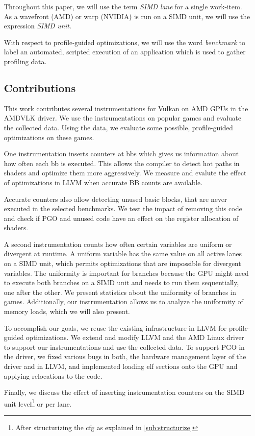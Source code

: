 Throughout this paper, we will use the term \emph{SIMD lane} for a single work-item. As a wavefront (AMD) or warp (NVIDIA) is run on a SIMD unit, we will use the expression \emph{SIMD unit}.

With respect to profile-guided optimizations, we will use the word \emph{benchmark} to label an automated, scripted execution of an application which is used to gather profiling data.


\subsection{Contributions}
\label{sub:contributions}
This work contributes several instrumentations for Vulkan on AMD GPUs in the AMDVLK driver. We use the instrumentations on popular games and evaluate the collected data. Using the data, we evaluate some possible, profile-guided optimizations on these games.

One instrumentation inserts counters at \glspl{bb} which gives us information about how often each \gls{bb} is executed. This allows the compiler to detect hot paths in shaders and optimize them more aggressively. We measure and evalute the effect of optimizations in LLVM when accurate BB counts are available.

Accurate counters also allow detecting unused basic blocks, that are never executed in the selected benchmarks. We test the impact of removing this code and check if PGO and unused code have an effect on the register allocation of shaders.

A second instrumentation counts how often certain variables are uniform or divergent at runtime. A uniform variable has the same value on all active lanes on a SIMD unit, which permits optimizations that are impossible for divergent variables.
The uniformity is important for branches because the GPU might need to execute both branches on a SIMD unit and needs to run them sequentially, one after the other. We present statistics about the uniformity of branches in games.
Additionally, our instrumentation allows us to analyze the uniformity of memory loads, which we will also present.

To accomplish our goals, we reuse the existing infrastructure in LLVM for profile-guided optimizations. We extend and modify LLVM and the AMD Linux driver to support our instrumentations and use the collected data.
To support PGO in the driver, we fixed various bugs in both, the hardware management layer of the driver and in LLVM, and implemented loading \gls{elf} sections onto the GPU and applying relocations to the code.

Finally, we discuss the effect of inserting instrumentation counters on the SIMD unit level\footnote{After structurizing the \gls{cfg} as explained in \cref{sub:structurize}} or per lane.

